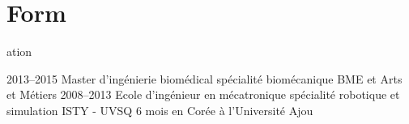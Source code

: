 \documentclass{cv-style}     %
\begin{document}

\section{Form}{ation}

\begin{entrylist}
\entry
{2013--2015}
{Master d'ingénierie biomédical {\normalfont spécialité biomécanique}}
{BME et Arts et Métiers}
{}
\entry
{2008--2013}
{Ecole d'ingénieur en mécatronique {\normalfont spécialité robotique et simulation}}
{ISTY - UVSQ}
{6 mois en Corée à l'Université Ajou}
\end{entrylist}
\end{document}
